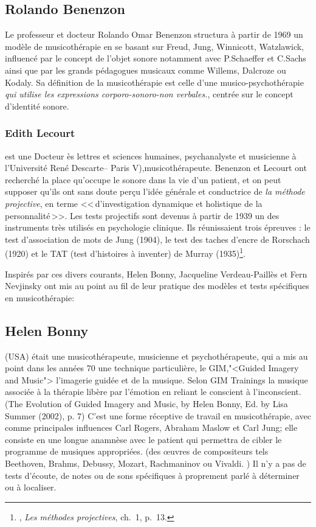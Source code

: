 	  \subsection{Rolando Benenzon} 
	  
	  \label{benenzon}
	  Le professeur et docteur Rolando Omar Benenzon structura à partir de 1969 un modèle de musicothérapie en se basant sur Freud, Jung, Winnicott, Watzlawick, influencé par le concept de l'objet sonore notamment avec P.Schaeffer et C.Sachs ainsi que par les grands pédagogues musicaux comme Willems, Dalcroze ou Kodaly. Sa définition de la musicothérapie est celle d'une musico-psychothérapie  \emph{\textsl{qui utilise les expressions corporo-sonoro-non verbales.}}, centrée sur le concept d'identité sonore.

        \subsubsection{Edith Lecourt} est une Docteur ès lettres et sciences humaines, psychanalyste et musicienne à l'Université René Descarte-- Paris V),musicothérapeute.
        Benenzon et Lecourt ont  recherché la place qu'occupe le sonore dans la vie d'un patient, et on peut supposer qu'ils ont sans doute perçu l'idée générale et conductrice de \emph{la méthode projective}, en terme 
	    <<\,d'investigation dynamique et holistique de la
        personnalité\,>>. Les tests projectifs sont devenus à partir
        de 1939 un des instruments très utilisés en psychologie
        clinique. Ils réunissaient trois épreuves : le test
        d'association de mots de Jung (1904), le test des taches
        d'encre de Rorschach (1920) et le TAT (test d'histoires à
        inventer) de Murray (1935)\footnote{\cite{anzieu.chabert:methodes}, \emph{Les méthodes projectives}, ch.~1, p.~13.}.
		

	
Inspirés par ces divers courants, Helen Bonny, Jacqueline Verdeau-Paillès et Fern Nevjinsky ont  mis au point au fil de leur pratique des modèles et tests spécifiques en musicothérapie:


\subsection{Helen Bonny} (USA) était une musicothérapeute,
musicienne et psychothérapeute, qui a mis au point dans les années 70
une technique particulière, le GIM,"<Guided Imagery and Music">
l'imagerie guidée et de la musique. Selon GIM
Trainings\autocite{gim_site} la
musique associée à la thérapie libère par l'émotion en reliant le
conscient à l'inconscient.(The Evolution of Guided Imagery and Music, by Helen Bonny, Ed. by Lisa Summer (2002), p. 7)
 C'est une forme réceptive de travail
en musicothérapie, avec comme principales influences Carl Rogers, Abraham Maslow et Carl Jung; elle  consiste en une longue anamnèse avec le
patient qui permettra de cibler le programme de musiques appropriées. 
(des \oe uvres de compositeurs tels Beethoven, Brahms, Debussy,
Mozart, Rachmaninov ou Vivaldi. )
Il n'y a  pas de
tests d'écoute, de notes ou de sons spécifiques à proprement parlé à déterminer ou à localiser.

